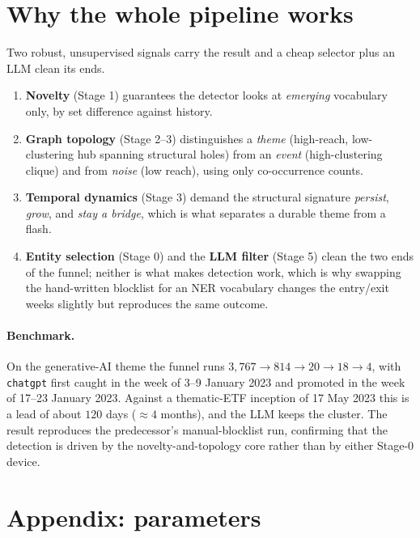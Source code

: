 \documentclass[11pt]{article}
\theoremstyle{definition}
\theoremstyle{remark}
\begin{document}
\section{Why the whole pipeline works}

Two robust, unsupervised signals carry the result and a cheap selector plus an LLM clean its
ends.
\begin{enumerate}[leftmargin=1.6em]
  \item \textbf{Novelty} (Stage 1) guarantees the detector looks at \emph{emerging} vocabulary
        only, by set difference against history.
  \item \textbf{Graph topology} (Stage 2--3) distinguishes a \emph{theme} (high-reach,
        low-clustering hub spanning structural holes) from an \emph{event} (high-clustering
        clique) and from \emph{noise} (low reach), using only co-occurrence counts.
  \item \textbf{Temporal dynamics} (Stage 3) demand the structural signature \emph{persist},
        \emph{grow}, and \emph{stay a bridge}, which is what separates a durable theme from a
        flash.
  \item \textbf{Entity selection} (Stage 0) and the \textbf{LLM filter} (Stage 5) clean the two
        ends of the funnel; neither is what makes detection work, which is why swapping the
        hand-written blocklist for an NER vocabulary changes the entry/exit weeks slightly but
        reproduces the same outcome.
\end{enumerate}

\paragraph{Benchmark.}
On the generative-AI theme the funnel runs
$3{,}767\to 814\to 20\to 18\to 4$, with \texttt{chatgpt} first caught in the week of
3--9 January 2023 and promoted in the week of 17--23 January 2023. Against a thematic-ETF
inception of 17 May 2023 this is a lead of about $120$ days ($\approx 4$ months), and the LLM
keeps the cluster. The result reproduces the predecessor's manual-blocklist run, confirming that
the detection is driven by the novelty-and-topology core rather than by either Stage-0 device.

\section*{Appendix: parameters}
\end{document}
